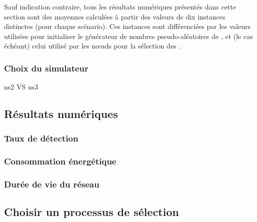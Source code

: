 Sauf indication contraire, tous les résultats numériques présentés dans cette section sont des moyennes calculées à partir des valeurs de dix instances distinctes (pour chaque scénario).
Ces instances sont différenciées par les valeurs utilisées pour initialiser le générateur de nombres pseudo-aléatoires de \nsii, et (le cas échéant) celui utilisé par les nœuds pour la sélection des \cns.

        \subsubsection{Choix du simulateur}

ns2 VS ns3

    \subsection{Résultats numériques}

        \subsubsection{Taux de détection}

        \subsubsection{Consommation énergétique}

        \subsubsection{Durée de vie du réseau}

    \subsection{Choisir un processus de sélection}
